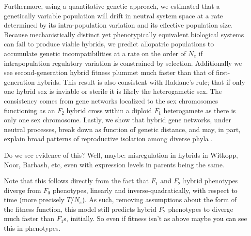 \documentclass{article}
\newcommand{\plr}[1]{\todo[color=blue!25]{#1}}
\newcommand{\js}[1]{\todo[color=green!25]{#1}}
\newcommand{\plr}[1]{{\color{blue}\it #1}}
\newcommand{\js}[1]{{\color{green}\it #1}}
\newcommand{\1}{\mathbbm{1}}
\begin{document}
Furthermore, using a quantitative genetic approach, we estimated that a genetically variable population will drift in neutral system space 
at a rate determined by its intra-population variation and its effective population size. 
Because mechanistically distinct yet phenotypically equivalent biological systems can fail to produce viable hybrids, we predict allopatric populations to accumulate genetic incompatibilities 
at a rate on the order of $N_{e}$ if intrapopulation regulatory variation is constrained by selection.
Additionally we see second-generation hybrid fitness plummet much faster than that of first-generation hybrids. 
\plr{refer to Turelli here}
This result is also consistent with Haldane's rule; that if only one hybrid sex is inviable or sterile it is likely the heterogametic sex. 
The consistency comes from gene networks localized to the sex chromosomes functioning as an $F_{2}$ hybrid cross within a diploid $F_{1}$ heterogamete as there is only one sex chromosome.
Lastly, we show that hybrid gene networks, under neutral processes, break down as function of genetic distance, and may, in part, explain broad patterns of reproductive isolation among diverse phyla \citep{roux2016shedding}.

Do we see evidence of this?  Well, maybe: misregulation in hybrids in Witkopp, Noor, Barbash, etc,
even with expression levels in parents being the same.

Note that this follows directly from the fact that $F_1$ and $F_2$ hybrid phenotypes diverge from $F_0$ phenotypes, linearly and inverse-quadratically, with respect to time (more precisely $T/N_e$). As such, removing assumptions about the form of the fitness function, this model still predicts hybrid $F_2$ phenotypes to diverge much faster than $F_1$s, initially.
So even if fitness isn't as above maybe you can see this in phenotypes.
\end{document}

